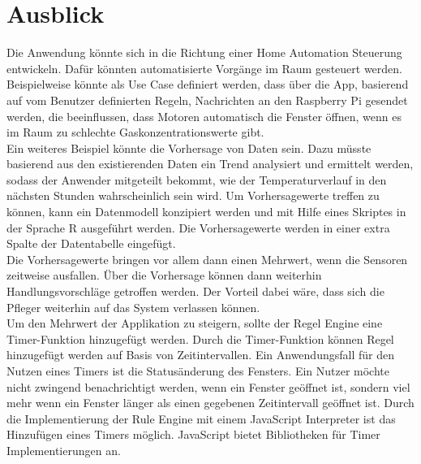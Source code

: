 \chapter{Ausblick}

Die Anwendung könnte sich in die Richtung einer Home Automation Steuerung entwickeln. Dafür könnten automatisierte Vorgänge im Raum gesteuert werden. Beispielweise könnte als Use Case definiert werden, dass über die App, basierend auf vom Benutzer definierten Regeln, Nachrichten an den Raspberry Pi gesendet werden, die beeinflussen, dass Motoren automatisch die Fenster öffnen, wenn es im Raum zu schlechte Gaskonzentrationswerte gibt.  
\\Ein weiteres Beispiel könnte die Vorhersage von Daten sein. Dazu müsste basierend aus den existierenden Daten ein Trend analysiert und ermittelt werden, sodass der Anwender mitgeteilt bekommt, wie der Temperaturverlauf in den nächsten Stunden wahrscheinlich sein wird. Um Vorhersagewerte treffen zu können, kann ein Datenmodell konzipiert werden und mit Hilfe eines Skriptes in der Sprache R ausgeführt werden. Die Vorhersagewerte werden in einer extra Spalte der Datentabelle eingefügt.\\
Die Vorhersagewerte bringen vor allem dann einen Mehrwert, wenn die Sensoren zeitweise ausfallen. Über die Vorhersage können dann weiterhin Handlungsvorschläge getroffen werden. Der Vorteil dabei wäre, dass sich die Pfleger weiterhin auf das System verlassen können.\\

Um den Mehrwert der Applikation zu steigern, sollte der Regel Engine eine Timer-Funktion hinzugefügt werden. Durch die Timer-Funktion können Regel hinzugefügt werden auf Basis von Zeitintervallen. Ein Anwendungsfall für den Nutzen eines Timers ist die Statusänderung des Fensters. Ein Nutzer möchte nicht zwingend benachrichtigt werden, wenn ein Fenster geöffnet ist, sondern viel mehr wenn ein Fenster länger als einen gegebenen Zeitintervall geöffnet ist. Durch die Implementierung der Rule Engine mit einem JavaScript Interpreter ist das Hinzufügen eines Timers möglich. JavaScript bietet Bibliotheken für Timer Implementierungen an.\\
